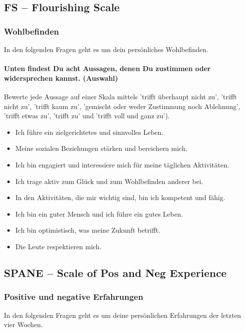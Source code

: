 \subsection{FS -- Flourishing Scale}\label{anhangSection.fs}   
\subsubsection{Wohlbefinden} 
In den folgenden Fragen geht es um dein persönliches Wohlbefinden.
\paragraph{Unten findest Du acht Aussagen, denen Du zustimmen oder widersprechen kannst. (Auswahl)}
Bewerte jede Aussage auf einer Skala mittels 'trifft überhaupt nicht zu', 'trifft nicht zu', 'trifft kaum zu', 'gemischt oder weder Zustimmung noch Ablehnung', 'trifft etwas zu', 'trifft zu' und 'trifft voll und ganz zu').
    \begin{itemize}
      \item Ich führe ein zielgerichtetes und sinnvolles Leben.
      \item Meine sozialen Beziehungen stärken und bereichern mich.
      \item Ich bin engagiert und interessiere mich für meine täglichen Aktivitäten.
      \item Ich trage aktiv zum Glück und zum Wohlbefinden anderer bei.
      \item In den Aktivitäten, die mir wichtig sind, bin ich kompetent und fähig.
      \item Ich bin ein guter Mensch und ich führe ein gutes Leben.
      \item Ich bin optimistisch, was meine Zukunft betrifft.
      \item Die Leute respektieren mich.
    \end{itemize}  
\subsection{SPANE -- Scale of Pos and Neg Experience}\label{anhangSection.spane}   
\subsubsection{Positive und negative Erfahrungen} 
In den folgenden Fragen geht es um deine persönlichen Erfahrungen der letzten vier Wochen.
